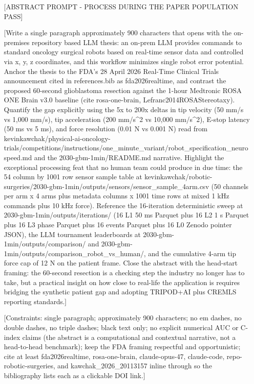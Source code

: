 
[ABSTRACT PROMPT - PROCESS DURING THE PAPER POPULATION PASS]

[Write a single paragraph approximately 900 characters that opens with
the on-premises repository based LLM thesis: an on-prem LLM provides
commands to standard oncology surgical robots based on real-time sensor
data and controlled via x, y, z coordinates, and this workflow
minimizes single robot error potential. Anchor the thesis to the FDA's
28 April 2026 Real-Time Clinical Trials announcement cited in
references.bib as fda2026realtime, and contrast the proposed 60-second
glioblastoma resection against the 1-hour Medtronic ROSA ONE Brain v3.0
baseline (cite rosa-one-brain, Lefranc2014ROSAStereotaxy). Quantify the
gap explicitly using the 5x to 200x deltas in tip velocity (50 mm/s vs
1,000 mm/s), tip acceleration (200 mm/s^2 vs 10,000 mm/s^2), E-stop
latency (50 ms vs 5 ms), and force resolution (0.01 N vs 0.001 N) read
from
kevinkawchak/physical-ai-oncology-trials/competitions/instructions/one_minute_variant/robot_specification_neurospeed.md
and the 2030-gbm-1min/README.md narrative. Highlight the exceptional
processing feat that no human team could produce in due time: the 54
column by 1001 row sensor sample table at
kevinkawchak/robotic-surgeries/2030-gbm-1min/outputs/sensors/sensor_sample_4arm.csv
(50 channels per arm x 4 arms plus metadata columns x 1001 time rows at
mixed 1 kHz commands plus 10 kHz force). Reference the 16-iteration
deterministic sweep at 2030-gbm-1min/outputs/iterations/ (16 L1 50 ms
Parquet plus 16 L2 1 s Parquet plus 16 L3 phase Parquet plus 16 events
Parquet plus 16 L0 Zenodo pointer JSON), the LLM tournament
leaderboards at 2030-gbm-1min/outputs/comparison/ and
2030-gbm-1min/outputs/comparison_robot_vs_human/, and the cumulative
4-arm tip force cap of 12 N on the patient frame. Close the abstract
with the head-start framing: the 60-second resection is a checking
step the industry no longer has to take, but a practical insight on how
close to real-life the application is requires bridging the synthetic
patient gap and adopting TRIPOD+AI plus CREMLS reporting standards.]

[Constraints: single paragraph; approximately 900 characters; no em
dashes, no double dashes, no triple dashes; black text only; no
explicit numerical AUC or C-index claims (the abstract is a
computational and contextual narrative, not a head-to-head benchmark);
keep the FDA framing respectful and opportunistic; cite at least
fda2026realtime, rosa-one-brain, claude-opus-47, claude-code,
repo-robotic-surgeries, and kawchak_2026_20113157 inline through
\cite{...} so the bibliography lists each as a clickable DOI link.]
